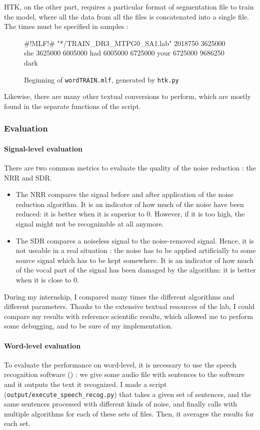 \newpage
\ac{HTK}, on the other part, requires a particular format of segmentation file to train the model, where all the data from all the files is concatenated into a single file. The times must be specified in samples :
 
\begin{figure}[h]
\centering
\begin{verbbox}
#!MLF!#
"*/TRAIN_DR3_MTPG0_SA1.lab"
2018750 3625000 she
3625000 6005000 had 
6005000 6725000 your 
6725000 9686250 dark 
\end{verbbox}
\theverbbox
\caption{Beginning of \texttt{wordTRAIN.mlf}, generated by \texttt{htk.py}}
\end{figure}

Likewise, there are many other textual conversions to perform, which are mostly found in the separate functions of the script.
\subsubsection{Evaluation}
\paragraph{Signal-level evaluation}
There are two common metrics\cite{horii2013musical} to evaluate the quality of the noise reduction : the \ac{NRR} and \ac{SDR}.
\begin{itemize}
\item The \ac{NRR} compares the signal before and after application of the noise reduction algorithm. It is an indicator of how much of the noise have been reduced: it is better when it is superior to $0$. However, if it is too high, the signal might not be recognizable at all anymore.
\item The \ac{SDR} compares a noiseless signal to the noise-removed signal. Hence, it is not useable in a real situation : the noise has to be applied artificially to some source signal which has to be kept somewhere. It is an indicator of how much of the vocal part of the signal has been damaged by the algorithm: it is better when it is close to $0$.
\end{itemize}

During my internship, I compared many times the different algorithms and different parameters. Thanks to the extensive textual resources of the lab, I could compare my results with reference scientific results, which allowed me to perform some debugging, and to be sure of my implementation.
\paragraph{Word-level evaluation}
To evaluate the performance on word-level, it is necessary to use the speech recognition software () : we give some audio file with sentences to the software and it outputs the text it recognized. I made a script (\texttt{output/execute\_speech\_recog.py}) that takes a given set of sentences, and the same sentences processed with different kinds of noise, and finally calls  with multiple algorithms for each of these sets of files. Then, it averages the results for each set.

